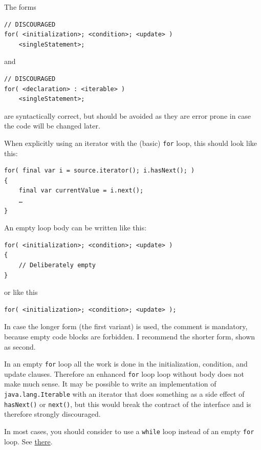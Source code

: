 The forms
\begin{lstlisting}
// DISCOURAGED
for( <initialization>; <condition>; <update> )
    <singleStatement>;
\end{lstlisting}
and
\begin{lstlisting}
// DISCOURAGED
for( <declaration> : <iterable> )
    <singleStatement>;
\end{lstlisting}
are syntactically correct, but should be avoided as they are error prone in case the code will be changed later.

When explicitly using an iterator \autocite{ORACLE_DOC_ITERATOR_INTERFACE} with the (basic) \lstinline|for| loop, this should look like this:
\begin{lstlisting}
for( final var i = source.iterator(); i.hasNext(); )
{
    final var currentValue = i.next();
    …
}
\end{lstlisting}

An empty loop body can be written like this:
\begin{lstlisting}
for( <initialization>; <condition>; <update> )
{
    // Deliberately empty
}
\end{lstlisting}
or like this
\begin{lstlisting}
for( <initialization>; <condition>; <update> );
\end{lstlisting}

In case the longer form (the first variant) is used, the comment is mandatory, because empty code blocks are forbidden. I recommend the shorter form, shown as second.

In an empty \lstinline|for| loop all the work is done in the initialization, condition, and update clauses. Therefore an enhanced \lstinline|for| loop loop without body does not make much sense. It may be possible to write an implementation of \lstinline|java.lang.Iterable| \autocite{ORACLE_DOC_ITERABLE_INTERFACE} with an iterator \autocite{ORACLE_DOC_ITERATOR_INTERFACE} that does something as a side effect of \lstinline|hasNext()| or \lstinline|next()|, but this would break the contract of the interface and is therefore strongly discouraged.

In most cases, you should consider to use a \lstinline|while| loop instead of an empty \lstinline|for| loop. See \hyperref[sec:WhileStatements]{there}.

